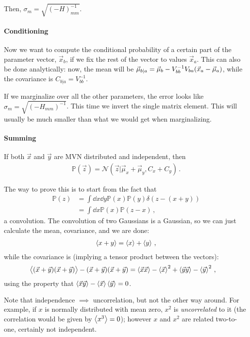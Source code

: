 \documentclass[main.tex]{subfiles}
\begin{document}

Then, \(\sigma _m = \sqrt{(- H)^{-1}_{mm}}\).

\paragraph{Conditioning}

Now we want to compute the conditional probability of a certain part of the parameter vector, \(\vec{x}_b\), if we fix the rest of the vector to values \(\vec{x}_a\). 
This can also be done analytically: now, the mean will be \(\vec{\mu}_{b | a} = \vec{\mu}_b - V^{-1}_{bb} V_{ba} \qty(\vec{x}_a - \vec{\mu}_a)\), while the covariance is \(C_{b | a} = V^{-1}_{bb}\).

If we marginalize over all the other parameters, the error looks like \(\sigma _m = \sqrt{(-H_{mm})^{-1}}\). This time we invert the single matrix element.
This will usually be much smaller than what we would get when marginalizing. 

\paragraph{Summing}

If both \(\vec{x}\) and \(\vec{y}\) are MVN distributed and independent, then 
%
\begin{align}
\mathbb{P}(\vec{z}) = \mathcal{N} (\vec{z} | \vec{\mu}_x + \vec{\mu}_y, C_x + C_y)
\,.
\end{align}

The way to prove this is to start from  the fact that 
%
\begin{align}
\mathbb{P}(z) &= \int \dd{x} \dd{y} \mathbb{P}(x) \mathbb{P}(y) \delta (z - (x + y))  \\
&= \int \dd{x} \mathbb{P}(x) \mathbb{P}(z-x) 
\,,
\end{align}
%
a convolution. The convolution of two Gaussians is a Gaussian, so we can just calculate the mean, covariance, and we are done: 
%
\begin{align}
\expval{x + y} = \expval{x} + \expval{y}
\,,
\end{align}
%
while the covariance is (implying a tensor product between the vectors):
%
\begin{align}
\expval{(\vec{x} + \vec{y})(\vec{x} + \vec{y})} - (\vec{x}+\vec{y})(\vec{x}+\vec{y}) 
&= \expval{\vec{x} \vec{x}} - \expval{\vec{x}}^2 + \expval{\vec{y} \vec{y}} - \expval{\vec{y}}^2
\,,
\end{align}
%
using the property that \(\expval{\vec{x} \vec{y}} - \expval{\vec{x}} \expval{\vec{y}} = 0\).

Note that independence \(\implies\) uncorrelation, but not the other way around. For example, if \(x\) is normally distributed with mean zero, \(x^2\) is \emph{uncorrelated} to it (the correlation would be given by \(\expval{x^3} = 0\)); however \(x\) and \(x^2\) are related two-to-one, certainly not independent. 
\end{document}
